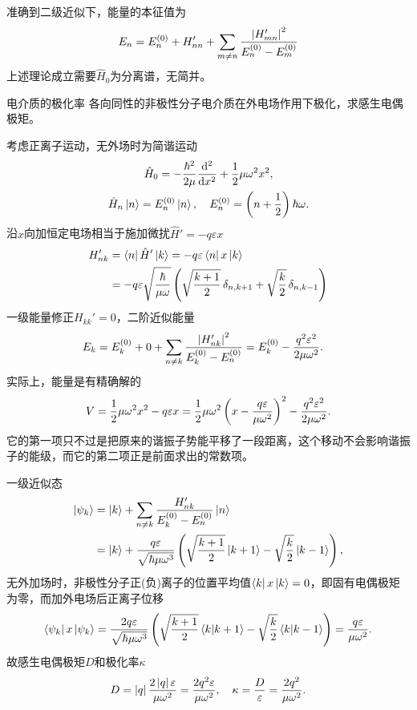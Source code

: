 准确到二级近似下，能量的本征值为
\begin{align}
	E_n=E_n^{(0)}+H_{nn}'+\sum_{m\neq n}\frac{\abs{H_{mn}'}^2}{E_n^{(0)}-E_m^{(0)}}
\end{align}
上述理论成立需要$\hat H_0$为分离谱，无简并。
\begin{example}{电介质的极化率}{}
	各向同性的非极性分子电介质在外电场作用下极化，求感生电偶极矩。

	考虑正离子运动，无外场时为简谐运动
	\begin{gather*}
		\hat H_0=-\frac{\hbar^2}{2\mu}\dd[2]x+\frac12\mu\omega^2x^2,\\
		\hat H_n\ket n=E_n^{(0)}\ket n,\quad E_n^{(0)}=\kh{n+\frac12}\hbar\omega.
	\end{gather*}
	沿$x$向加恒定电场相当于施加微扰$\hat H'=-q\varepsilon x$
	\begin{align*}
		H_{nk}'&=\bra n\hat H'\ket k=-q\varepsilon\bra nx\ket k\\
		&=-q\varepsilon\sqrt{\frac\hbar{\mu\omega}}\kh{\sqrt{\frac{k+1}2}\vd_{n,k+1}+\sqrt{\frac k2}\vd_{n,k-1}}
	\end{align*}
	一级能量修正$H_{kk}'=0$，二阶近似能量
	\begin{align*}
		E_k&=E_k^{(0)}+0+\sum_{n\neq k}\frac{\abs{H_{nk}'}^2}{E_k^{(0)}-E_n^{(0)}}=E_k^{(0)}-\frac{q^2\varepsilon^2}{2\mu\omega^2}.
	\end{align*}
	实际上，能量是有精确解的
	\[
V=\frac12\mu\omega^2x^2-q\varepsilon x=\frac12\mu\omega^2\kh{x-\frac{q\varepsilon}{\mu\omega^2}}^2-\frac{q^2\varepsilon^2}{2\mu\omega^2}.
\]
	它的第一项只不过是把原来的谐振子势能平移了一段距离，这个移动不会影响谐振子的能级，而它的第二项正是前面求出的常数项。

	一级近似态
	\begin{align*}
		\ket{\psi_k}&=\ket k+\sum_{n\neq k}\frac{H_{nk}'}{E_k^{(0)}-E_n^{(0)}}\ket n\\
		&=\ket k+\frac{q\varepsilon}{\sqrt{\hbar\mu\omega^3}}\kh{\sqrt{\frac{k+1}2}\ket{k+1}-\sqrt{\frac k2}\ket{k-1}},
	\end{align*}
	无外加场时，非极性分子正(负)离子的位置平均值$\bra kx\ket k=0$，即固有电偶极矩为零，而加外电场后正离子位移
	\[
		\bra{\psi_k}x\ket{\psi_k}=\frac{2q\varepsilon}{\sqrt{\hbar\mu\omega^3}}\kh{\sqrt{\frac{k+1}2}\brkt k{k+1}-\sqrt{\frac k2}\brkt k{k-1}}=\frac{q\varepsilon}{\mu\omega^2}.
\]
	故感生电偶极矩$D$和极化率$\kappa$
	\[
D=\abs q\frac{2\abs q\varepsilon}{\mu\omega^2}=\frac{2q^2\varepsilon}{\mu\omega^2},\quad \kappa=\frac D\varepsilon=\frac{2q^2}{\mu\omega^2}.
\]
\end{example}
